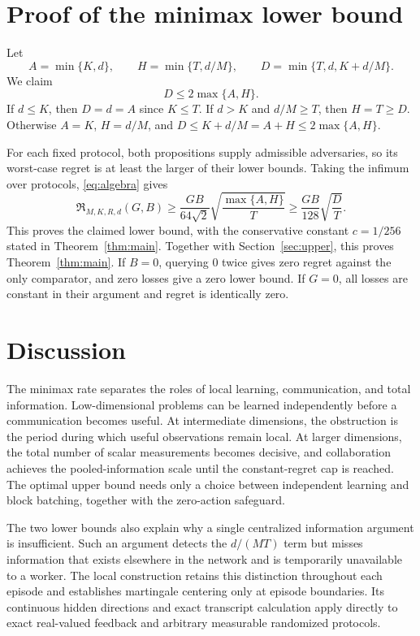 \documentclass[11pt,a4paper]{article}
\numberwithin{equation}{section}
\theoremstyle{remark}
\newcommand{\calR}{\mathfrak R}
\begin{document}
\section{Proof of the minimax lower bound}
\label{sec:combine}

Let
\[
 A=\min\{K,d\},\qquad H=\min\{T,d/M\},\qquad
 D=\min\{T,d,K+d/M\}.
\]
We claim
\begin{equation}
 D\le2\max\{A,H\}.                       \label{eq:algebra}
\end{equation}
If $d\le K$, then $D=d=A$ since $K\le T$.
If $d>K$ and $d/M\ge T$, then $H=T\ge D$.
Otherwise $A=K$, $H=d/M$, and
$D\le K+d/M=A+H\le2\max\{A,H\}$.

For each fixed protocol, both propositions supply admissible adversaries,
so its worst-case regret is at least the larger of their lower bounds.
Taking the infimum over protocols, \eqref{eq:algebra} gives
\[
 \calR_{M,K,R,d}(G,B)
 \ge\frac{GB}{64\sqrt2}
       \sqrt{\frac{\max\{A,H\}}T}
 \ge\frac{GB}{128}\sqrt{\frac DT}.
\]
This proves the claimed lower bound, with the conservative constant $c=1/256$ stated in Theorem~\ref{thm:main}.
Together with Section~\ref{sec:upper}, this proves
Theorem~\ref{thm:main}. If $B=0$, querying $0$ twice gives zero regret
against the only comparator, and zero losses give a zero lower bound.
If $G=0$, all losses are constant in their argument and regret is
identically zero.

\section{Discussion}
\label{sec:discussion}

The minimax rate separates the roles of local learning, communication,
and total information. Low-dimensional problems can be learned
independently before a communication becomes useful. At intermediate
dimensions, the obstruction is the period during which useful
observations remain local. At larger dimensions, the total number of
scalar measurements becomes decisive, and collaboration achieves the
pooled-information scale until the constant-regret cap is reached.
The optimal upper bound needs only a choice between independent
learning and block batching, together with the zero-action safeguard.

The two lower bounds also explain why a single centralized information
argument is insufficient. Such an argument detects the $d/(MT)$ term
but misses information that exists elsewhere in the network and is
temporarily unavailable to a worker. The local construction retains
this distinction throughout each episode and establishes martingale
centering only at episode boundaries. Its continuous hidden directions
and exact transcript calculation apply directly to exact real-valued
feedback and arbitrary measurable randomized protocols.
\end{document}
